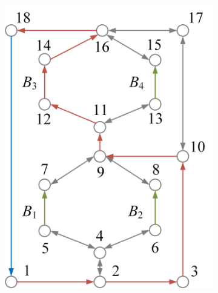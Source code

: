 \documentclass{article}
\begin{document}
\begin{figure}[htbp]
\begin{subfigure}[b]{0.45\textwidth}
        \includegraphics[width=\textwidth]{../attachments/ef-sp3.png}
        \caption{}
        \label{fig:sp3}
    \end{subfigure}
    \hspace{0.05\textwidth}
    \begin{subfigure}[b]{0.45\textwidth}

\end{subfigure}
\end{figure}
\end{document}
